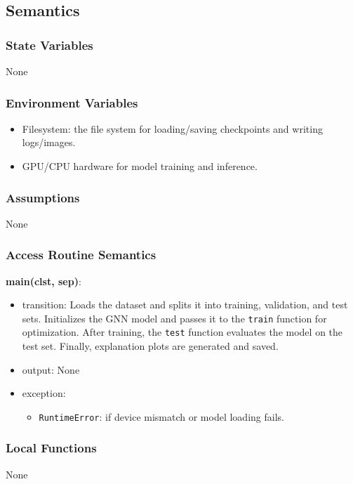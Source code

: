 \documentclass[12pt, titlepage]{article}
\begin{document}
\subsection{Semantics}

\subsubsection{State Variables}
None

\subsubsection{Environment Variables}
\begin{itemize}
  \item Filesystem: the file system for loading/saving checkpoints and writing logs/images.
  \item GPU/CPU hardware for model training and inference.
\end{itemize}

\subsubsection{Assumptions}
None

\subsubsection{Access Routine Semantics}

\noindent \textbf{main(clst, sep)}:
\begin{itemize}
  \item transition: Loads the dataset and splits it into training, validation, and test sets. Initializes the GNN model and passes it to the \texttt{train} function for optimization. After training, the \texttt{test} function evaluates the model on the test set. Finally, explanation plots are generated and saved.
  \item output: None
  \item exception:
  \begin{itemize}
    \item \texttt{RuntimeError}: if device mismatch or model loading fails.
  \end{itemize}
\end{itemize}

\subsubsection{Local Functions}
None
\end{document}
